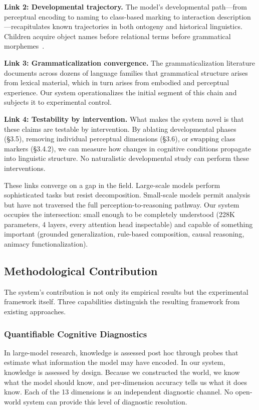 \documentclass{article}
\begin{document}
\textbf{Link 2: Developmental trajectory.} The model's developmental path---from perceptual encoding to naming to class-based marking to interaction description---recapitulates known trajectories in both ontogeny and historical linguistics. Children acquire object names before relational terms before grammatical morphemes~\citep{clark2003,tomasello2003}.

\textbf{Link 3: Grammaticalization convergence.} The grammaticalization literature documents across dozens of language families that grammatical structure arises from lexical material, which in turn arises from embodied and perceptual experience. Our system operationalizes the initial segment of this chain and subjects it to experimental control.

\textbf{Link 4: Testability by intervention.} What makes the system novel is that these claims are testable by intervention. By ablating developmental phases (\S3.5), removing individual perceptual dimensions (\S3.6), or swapping class markers (\S3.4.2), we can measure how changes in cognitive conditions propagate into linguistic structure. No naturalistic developmental study can perform these interventions.

These links converge on a gap in the field. Large-scale models perform sophisticated tasks but resist decomposition. Small-scale models permit analysis but have not traversed the full perception-to-reasoning pathway. Our system occupies the intersection: small enough to be completely understood (228K parameters, 4 layers, every attention head inspectable) and capable of something important (grounded generalization, rule-based composition, causal reasoning, animacy functionalization).

\subsection{Methodological Contribution}

The system's contribution is not only its empirical results but the experimental framework itself. Three capabilities distinguish the resulting framework from existing approaches.

\subsubsection{Quantifiable Cognitive Diagnostics}

In large-model research, knowledge is assessed post hoc through probes that estimate what information the model may have encoded. In our system, knowledge is assessed by design. Because we constructed the world, we know what the model should know, and per-dimension accuracy tells us what it does know. Each of the 13 dimensions is an independent diagnostic channel. No open-world system can provide this level of diagnostic resolution.
\end{document}
